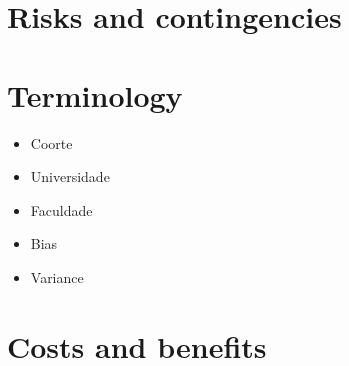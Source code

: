 \documentclass{report}
\begin{document}
\chapter{Risks and contingencies}

\chapter{Terminology}

\begin{itemize}
\item Coorte
\item Universidade
\item Faculdade
\item Bias
\item Variance
\end{itemize}

\chapter{Costs and benefits}



\end{document}
